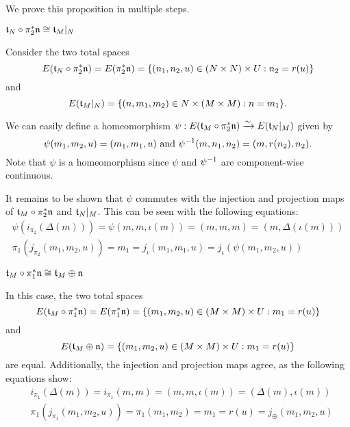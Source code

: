 \begin{myproof}
    We prove this proposition in multiple steps.
    \begin{steps}
        \item $\mathfrak{t}_N \circ \pi_2^*\mathfrak{n} \cong \mathfrak{t}_M\vert_{N}$
        
        Consider the two total spaces
        \[ E(\mathfrak{t}_N \circ \pi_2^*\mathfrak{n}) = E(\pi_2^*\mathfrak{n}) = \{(n_1, n_2, u) \in (N \times N) \times U:n_2 = r(u)\} \]
        and
        \[ E(\mathfrak{t}_M\vert_{N}) = \{(n, m_1, m_2) \in N \times (M \times M):n = m_1\}. \]

        We can easily define a homeomorphism $\psi: E(\mathfrak{t}_M \circ \pi_2^*\mathfrak{n}) \xrightarrow{\sim} E(\mathfrak{t}_N\vert_{M})$ given by
        \[ \psi(m_1, m_2, u) = (m_1, m_1, u) \text{ and } \psi^{-1}(m, n_1, n_2) = (m, r(n_2), n_2). \]
        Note that $\psi$ is a homeomorphism since $\psi$ and $\psi^{-1}$ are component-wise continuous.

        It remains to be shown that $\psi$
        commutes with the injection and projection maps of $\mathfrak{t}_M \circ \pi_2^*\mathfrak{n}$ and $\mathfrak{t}_N\vert_{M}$.
        This can be seen with the following equations:
        \begin{align}
            \psi(i_{\pi_2}(\Delta(m))) = \psi(m, m, \iota(m)) = (m, m, m) = (m, \Delta(\iota(m))) \\
            \pi_1(j_{\pi_2}(m_1, m_2, u)) = m_1 = j_\iota(m_1, m_1, u) = j_\iota(\psi(m_1, m_2, u))
        \end{align}
        
        \item $\mathfrak{t}_M \circ \pi_1^*\mathfrak{n} \cong \mathfrak{t}_M \oplus{} \mathfrak{n}$
        
        In this case, the two total spaces
        \[ E(\mathfrak{t}_M \circ \pi_1^*\mathfrak{n}) = E(\pi_1^*\mathfrak{n}) = \{(m_1, m_2, u) \in (M \times M) \times U:m_1 = r(u)\} \]
        and
        \[ E(\mathfrak{t}_M \oplus{} \mathfrak{n}) = \{(m_1, m_2, u) \in (M \times M) \times U:m_1 = r(u)\} \]
        are equal.
        Additionally,
        the injection and projection maps agree, as the following equations show:
        \begin{align}
            & i_{\pi_1}(\Delta(m)) = i_{\pi_1}(m, m) = (m, m, \iota(m)) = (\Delta(m), \iota(m)) \\
            & \pi_1(j_{\pi_1}(m_1, m_2, u)) = \pi_1(m_1, m_2) = m_1 = r(u) = j_{\oplus}(m_1, m_2, u)
        \end{align}


\end{steps}
\end{myproof}
